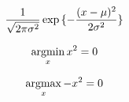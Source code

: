 \documentclass[]{article}
\begin{document}
\begin{eqnarray}
\frac{1}{\sqrt{2\pi {\sigma}^2}} \exp{ \{ -\frac{ (x - \mu)^2 }{ 2 \sigma^2 } \} }
\end{eqnarray}

\begin{eqnarray}
\mathop{\rm argmin}\limits_{x} x^2 = 0
\end{eqnarray}

\begin{eqnarray}
\mathop{\rm argmax}\limits_{x} -x^2 = 0
\end{eqnarray}
\end{document}
